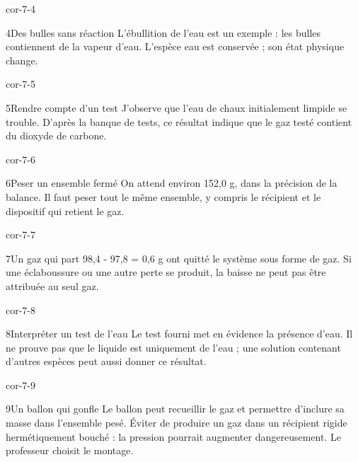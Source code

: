 \documentclass[12pt,twoside,openany]{book}
\begin{document}
\begin{blocLivre}{cor-7-4}
\begin{corrige}{4}{Des bulles sans réaction}
L’ébullition de l’eau est un exemple : les bulles contiennent de la vapeur d’eau. L’espèce eau est conservée ; son état physique change.\par
\end{corrige}\end{blocLivre}
\begin{blocLivre}{cor-7-5}
\begin{corrige}{5}{Rendre compte d’un test}
J’observe que l’eau de chaux initialement limpide se trouble. D’après la banque de tests, ce résultat indique que le gaz testé contient du dioxyde de carbone.\par
{}
\end{corrige}\end{blocLivre}
\begin{blocLivre}{cor-7-6}
\begin{corrige}{6}{Peser un ensemble fermé}
On attend environ 152,0 g, dans la précision de la balance. Il faut peser tout le même ensemble, y compris le récipient et le dispositif qui retient le gaz.\par
\end{corrige}\end{blocLivre}
\begin{blocLivre}{cor-7-7}
\begin{corrige}{7}{Un gaz qui part}
98,4 - 97,8 = 0,6 g ont quitté le système sous forme de gaz. Si une éclaboussure ou une autre perte se produit, la baisse ne peut pas être attribuée au seul gaz.\par
\end{corrige}\end{blocLivre}
\begin{blocLivre}{cor-7-8}
\begin{corrige}{8}{Interpréter un test de l’eau}
Le test fourni met en évidence la présence d’eau. Il ne prouve pas que le liquide est uniquement de l’eau ; une solution contenant d’autres espèces peut aussi donner ce résultat.\par
{}
\end{corrige}\end{blocLivre}
\begin{blocLivre}{cor-7-9}
\begin{corrige}{9}{Un ballon qui gonfle}
Le ballon peut recueillir le gaz et permettre d’inclure sa masse dans l’ensemble pesé. Éviter de produire un gaz dans un récipient rigide hermétiquement bouché : la pression pourrait augmenter dangereusement. Le professeur choisit le montage.\par
{}
\end{corrige}\end{blocLivre}
\end{document}
